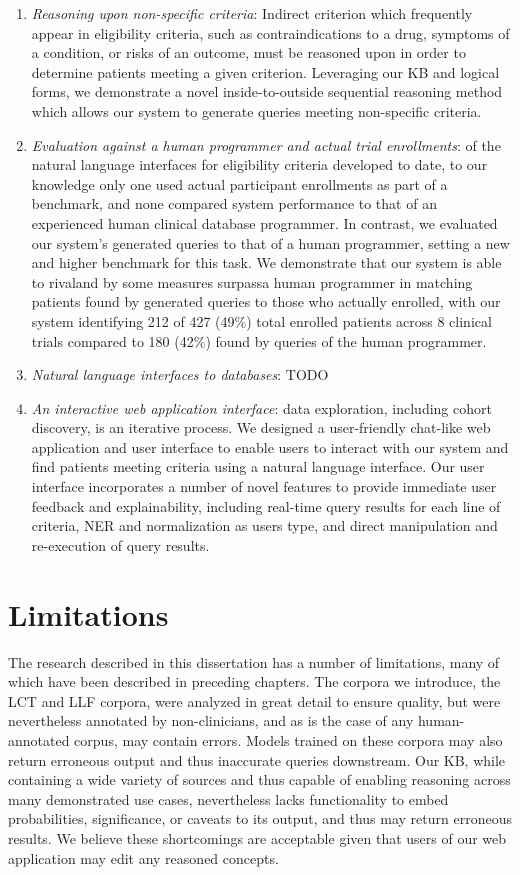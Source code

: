 \documentclass[../main.tex]{subfiles}
\begin{document}
\begin{enumerate}
    \item \textit{Reasoning upon non-specific criteria}: Indirect criterion which frequently appear in eligibility criteria, such as contraindications to a drug, symptoms of a condition, or risks of an outcome, must be reasoned upon in order to determine patients meeting a given criterion. Leveraging our KB and logical forms, we demonstrate a novel inside-to-outside sequential reasoning method which allows our system to generate queries meeting non-specific criteria.
    \item \textit{Evaluation against a human programmer and actual trial enrollments}: of the natural language interfaces for eligibility criteria developed to date, to our knowledge only one used actual participant enrollments as part of a benchmark, and none compared system performance to that of an experienced human clinical database programmer. In contrast, we evaluated our system's generated queries to that of a human programmer, setting a new and higher benchmark for this task. We demonstrate that our system is able to rival\textemdash and by some measures surpass\textemdash a human programmer in matching patients found by generated queries to those who actually enrolled, with our system identifying 212 of 427 (49\%) total enrolled patients across 8 clinical trials compared to 180 (42\%) found by queries of the human programmer.
    \item \textit{Natural language interfaces to databases}: TODO
    \item \textit{An interactive web application interface}: data exploration, including cohort discovery, is an iterative process. We designed a user-friendly chat-like web application and user interface to enable users to interact with our system and find patients meeting criteria using a natural language interface. Our user interface incorporates a number of novel features to provide immediate user feedback and explainability, including real-time query results for each line of criteria, NER and normalization as users type, and direct manipulation and re-execution of query results.
\end{enumerate}

\section{Limitations}

The research described in this dissertation has a number of limitations, many of which have been described in preceding chapters. The corpora we introduce, the LCT and LLF corpora, were analyzed in great detail to ensure quality, but were nevertheless annotated by non-clinicians, and as is the case of any human-annotated corpus, may contain errors. Models trained on these corpora may also return erroneous output and thus inaccurate queries downstream. Our KB, while containing a wide variety of sources and thus capable of enabling reasoning across many demonstrated use cases, nevertheless lacks functionality to embed probabilities, significance, or caveats to its output, and thus may return erroneous results. We believe these shortcomings are acceptable given that users of our web application may edit any reasoned concepts. 
\end{document}
